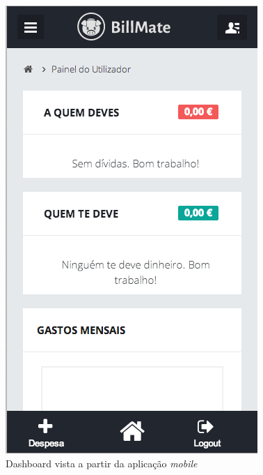 \begin{figure}[H]
\centering
\includegraphics[width=.9\textwidth]{images/protmobile}
\caption{Dashboard vista a partir da aplicação \emph{mobile}}
\label{fig:proto_mobile}
\end{figure}
